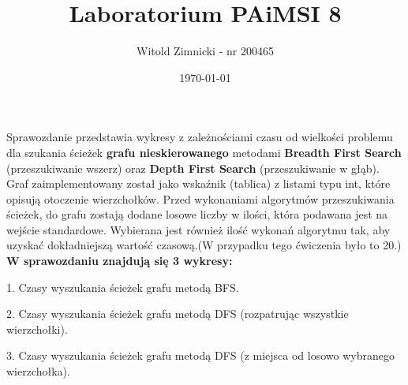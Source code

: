 \documentclass[12pt,a4paper,titlepage]{article}
\title{Laboratorium PAiMSI 8}
\date{\today}
\author{Witold Zimnicki - nr 200465}
\begin{document}
	\maketitle
	\pagestyle{empty}
	\pagestyle{headings}
	
	Sprawozdanie przedstawia wykresy z zależnościami czasu od wielkości problemu dla szukania ścieżek \textbf{grafu nieskierowanego} metodami \textbf{Breadth First Search} (przeszukiwanie wszerz) oraz \textbf{Depth First Search} (przeszukiwanie w głąb). Graf zaimplementowany został jako wskaźnik (tablica) z listami typu int, które opisują otoczenie wierzchołków. Przed wykonaniami algorytmów przeszukiwania ścieżek, do grafu zostają dodane losowe liczby w ilości, która podawana jest na wejście standardowe. Wybierana jest również ilość wykonań algorytmu tak, aby uzyskać dokładniejszą wartość czasową.(W przypadku tego ćwiczenia było to 20.)\newline
	\newline
	\textbf{W sprawozdaniu znajdują się 3 wykresy:}\newline
	
	1. Czasy wyszukania ścieżek grafu metodą BFS. \newline
	 
	2. Czasy wyszukania ścieżek grafu metodą DFS (rozpatrując wszystkie wierzchołki). \newline
	
	3. Czasy wyszukania ścieżek grafu metodą DFS (z miejsca od losowo wybranego wierzchołka).
	
	
	

		\newline
		\newline
	
\end{document}
